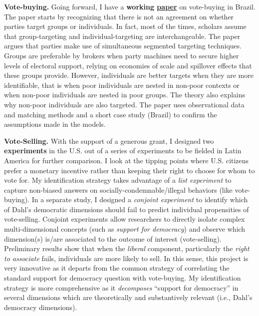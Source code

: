 \documentclass[11pt]{letter} %
\begin{document}
\begin{letter}{}
{\bf Vote-buying.} Going forward, I have a {\bf working \href{https://github.com/hbahamonde/Clientelism_paper/raw/master/Bahamonde_Clientelism_Paper.pdf}{paper}} on vote-buying in Brazil. The paper starts by recognizing that there is not an agreement on whether parties target groups or individuals. In fact, most of the times, scholars assume that group-targeting and individual-targeting are interchangeable. The paper argues that parties make use of simultaneous segmented targeting techniques. Groups are preferable by brokers when party machines need to secure higher levels of electoral support, relying on economies of scale and spillover effects that these groups provide. However, individuals are better targets when they are more identifiable, that is when poor individuals are nested in non-poor contexts or when non-poor individuals are nested in poor groups. The theory also explains why non-poor individuals are also targeted. The paper uses observational data and matching methods and a short case study (Brazil) to confirm the assumptions made in the models.

{\bf Vote-Selling.} With the support of a generous grant, I designed two {\bf experiments} in the U.S. out of a series of experiments to be fielded in Latin America for further comparison. I look at the tipping points where U.S. citizens prefer a monetary incentive rather than keeping their right to choose for whom to vote for. My identification strategy takes advantage of a \emph{list experiment} to capture non-biased answers on socially-condemnable/illegal behaviors (like vote-buying). In a separate study, I designed a \emph{conjoint experiment} to identify which of Dahl's democratic dimensions should fail to predict individual propensities of vote-selling. Conjoint experiments allow researchers to directly isolate complex multi-dimensional concepts (such as \emph{support for democracy}) and observe which dimension(s) is/are associated to the outcome of interest (vote-selling). Preliminary results show that when the \emph{liberal} component, particularly the \emph{right to associate} fails, individuals are more likely to sell. In this sense, this project is very innovative as it departs from the common strategy of correlating the standard support for democracy question with vote-buying. My identification strategy is more comprehensive as it \emph{decomposes} ``support for democracy'' in several dimensions which are theoretically and substantively relevant (i.e., Dahl's democracy dimensions). 



\end{letter}
\end{document}
